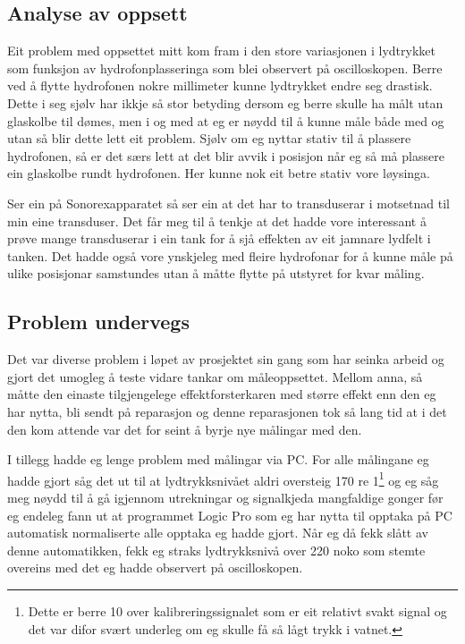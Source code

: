 \subsection{Analyse av oppsett}
Eit problem med oppsettet mitt kom fram i den store variasjonen i lydtrykket som funksjon av hydrofonplasseringa som blei observert på oscilloskopen. Berre ved å flytte hydrofonen nokre millimeter kunne lydtrykket endre seg drastisk. Dette i seg sjølv har ikkje så stor betyding dersom eg berre skulle ha målt utan glaskolbe til dømes, men i og med at eg er nøydd til å kunne måle både med og utan så blir dette lett eit problem. Sjølv om eg nyttar stativ til å plassere hydrofonen, så er det særs lett at det blir avvik i posisjon når eg så må plassere ein glaskolbe rundt hydrofonen. Her kunne nok eit betre stativ vore løysinga.

Ser ein på Sonorexapparatet så ser ein at det har to transduserar i motsetnad til min eine transduser. Det får meg til å tenkje at det hadde vore interessant å prøve mange transduserar i ein tank for å sjå effekten av eit jamnare lydfelt i tanken. Det hadde også vore ynskjeleg med fleire hydrofonar for å kunne måle på ulike posisjonar samstundes utan å måtte flytte på utstyret for kvar måling.

\subsection{Problem undervegs}
Det var diverse problem i løpet av prosjektet sin gang som har seinka arbeid og gjort det umogleg å teste vidare tankar om måleoppsettet. Mellom anna, så måtte den einaste tilgjengelege effektforsterkaren med større effekt enn den eg har nytta, bli sendt på reparasjon og denne reparasjonen tok så lang tid at i det den kom attende var det for seint å byrje nye målingar med den.  

I tillegg hadde eg lenge problem med målingar via PC. For alle målingane eg hadde gjort såg det ut til at lydtrykksnivået aldri oversteig \unit{170}{\deci\bel} re \unit{1}{\micro\pascal}\footnote{Dette er berre \unit{10}{\deci\bel} over kalibreringssignalet som er eit relativt svakt signal og det var difor svært underleg om eg skulle få så lågt trykk i vatnet.} og eg såg meg nøydd til å gå igjennom utrekningar og signalkjeda mangfaldige gonger før eg endeleg fann ut at programmet Logic Pro som eg har nytta til opptaka på PC automatisk normaliserte alle opptaka eg hadde gjort. Når eg då fekk slått av denne automatikken, fekk eg straks lydtrykksnivå over \unit{220}{\deci\bel} noko som stemte overeins med det eg hadde observert på oscilloskopen.